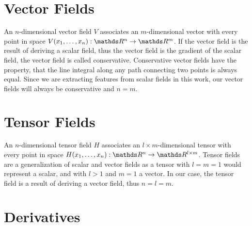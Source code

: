 \section{Vector Fields}

An $n$-dimensional vector field $V$ associates an $m$-dimensional vector
with every point in space $V(x_1,\dots,x_n):\real^n \rightarrow \real^m$.
If the vector field is the result of deriving a scalar field, thus the 
vector field is the gradient of the scalar field, the vector field is
called conservative. Conservative vector fields have the property, that
the line integral along any path connecting two points is always equal.
Since we are extracting features from scalar fields in this work, our
vector fields will always be conservative and $n = m$.

\section{Tensor Fields}

An $n$-dimensional tensor field $H$ associates an $l \times
m$-dimensional tensor with every point in space $H(x_1,\dots,x_n):
\real^n \rightarrow \real^{l \times m}$. Tensor fields are a
generalization of scalar and vector fields as a tensor with $l = m = 1$
would represent a scalar, and with $l > 1$ and $m = 1$ a vector. In our
case, the tensor field is a result of deriving a vector field, thus $n =
l = m$.

\section{Derivatives}

